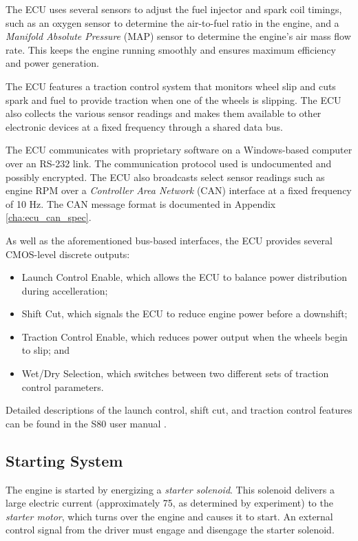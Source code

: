 The ECU uses several sensors to adjust the fuel injector and spark coil timings, such as an oxygen sensor to determine the air-to-fuel ratio in the engine, and a \emph{Manifold Absolute Pressure} (MAP) sensor to determine the engine's air mass flow rate. This keeps the engine running smoothly and ensures maximum efficiency and power generation. 

The ECU features a traction control system that monitors wheel slip and cuts spark and fuel to provide traction when one of the wheels is slipping. The ECU also collects the various sensor readings and makes them available to other electronic devices at a fixed frequency through a shared data bus. 


The ECU communicates with proprietary software on a Windows-based computer over an RS-232 link. The communication protocol used is undocumented and possibly encrypted. The ECU also broadcasts select sensor readings such as engine RPM over a \emph{Controller Area Network} (CAN) interface at a fixed frequency of 10 Hz. The CAN message format is documented in Appendix \ref{cha:ecu_can_spec}.

As well as the aforementioned bus-based interfaces, the ECU provides several CMOS-level discrete outputs:

\begin{itemize}
	\item Launch Control Enable, which allows the ECU to balance power distribution during accelleration;
    \item Shift Cut, which signals the ECU to reduce engine power before a downshift;
    \item Traction Control Enable, which reduces power output when the wheels begin to slip; and
    \item Wet/Dry Selection, which switches between two different sets of traction control parameters.
\end{itemize}

Detailed descriptions of the launch control, shift cut, and traction control features can be found in the S80 user manual \cite{s80pro}.
 
\subsection{Starting System}
\label{sec:background_engine_starter}

The engine is started by energizing a \emph{starter solenoid}. This solenoid delivers a large electric current (approximately \unit{75}{\ampere}, as determined by experiment) to the \emph{starter motor}, which turns over the engine and causes it to start. An external control signal from the driver must engage and disengage the starter solenoid. 


